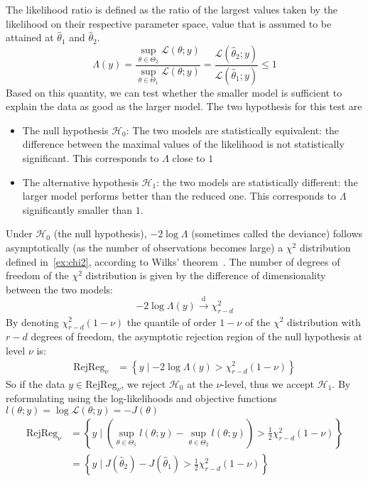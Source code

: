 \documentclass[../../Main_ManuscritThese.tex]{subfiles}
\begin{document}
The likelihood ratio is defined as the ratio of the largest values taken by the likelihood on their respective parameter space, value that is assumed to be attained at $\hat{\theta}_1$ and $\hat{\theta}_2$.
\begin{equation}
  \label{eq:def_lik_ratio}
  \Lambda(y) = \frac{\sup_{\theta \in \Theta_2} \mathcal{L}(\theta ; y)}{\sup_{\theta \in \Theta_1} \mathcal{L}(\theta ; y)} = \frac{\mathcal{L}(\hat{\theta}_2 ; y)}{\mathcal{L}(\hat{\theta}_1 ; y)} \leq 1
\end{equation}
Based on this quantity, we can test whether the smaller model is sufficient to explain the data as good as the larger model. The two hypothesis for this test are
\begin{itemize}
\item The null hypothesis $\mathcal{H}_0$: The two models are statistically equivalent: the difference between the maximal values of the likelihood is not statistically significant. This corresponds to $\Lambda$ close to $1$
\item  The alternative hypothesis $\mathcal{H}_1$: the two models are statistically different: the larger model performs better than the reduced one. This corresponds to $\Lambda$ significantly smaller than $1$.
\end{itemize}
Under $\mathcal{H}_0$ (the null hypothesis), $-2 \log \Lambda$ (sometimes called the deviance) follows asymptotically (as the number of observations becomes large) a $\chi^2$ distribution defined in~\cref{ex:chi2}, according to Wilks' theorem~\cite{wilks_large-sample_1938}. The number of degrees of freedom of the $\chi^2$ distribution is given by the difference of dimensionality between the two models:
\begin{equation}
  \label{eq:deviance_asymptotics}
  - 2 \log \Lambda(y) \xrightarrow[]{\mathrm{d}} \chi^2_{r-d}
\end{equation}
By denoting $\chi^2_{r-d}(1-\nu)$ the quantile of order $1-\nu$ of the $\chi^2$ distribution with $r-d$ degrees of freedom, the asymptotic rejection region of the null hypothesis at level $\nu$ is:
\begin{align}
  \mathrm{RejReg}_{\nu} &= \left\{y \mid -2 \log \Lambda(y) > \chi^2_{r-d}(1-\nu) \right\} \label{eq:LRT_rej_reg}
\end{align}
So if the data $y \in \mathrm{RejReg}_{\nu}$, we reject $\mathcal{H}_0$ at the $\nu$-level, thus we accept $\mathcal{H}_1$.
By reformulating using the log-likelihoods and objective functions $l(\theta;y) = \log \mathcal{L}(\theta;y) = - J(\theta)$
\begin{align}
  \mathrm{RejReg}_{\nu} &= \left\{ y \mid (\sup_{\theta\in\Theta_1} l(\theta;y) - \sup_{\theta\in\Theta_2} l(\theta;y)) > \frac12 \chi^2_{r-d}(1-\nu) \right\} \\
                             &= \left\{ y \mid J(\hat{\theta}_2) - J(\hat{\theta}_1) >  \frac12 \chi^2_{r-d}(1-\nu) \right\} \label{eq:rejreg_chi2}
\end{align}
\end{document}
